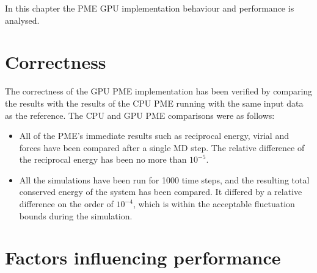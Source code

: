 \documentclass[12pt,a4paper]{report}
\newcommand{\draft}[1]{#1}
\begin{document}
In this chapter the PME GPU implementation behaviour and performance is analysed.

\section{Correctness}
The correctness of the GPU PME implementation has been verified by comparing the results with the results of the CPU PME running with the same input data as the reference.
The CPU and GPU PME comparisons were as follows:
\begin{itemize}
\item All of the PME's immediate results such as reciprocal energy, virial and forces have been compared after a single MD step. The relative difference of the reciprocal energy has been no more than $10^{-5}$. 


\item All the simulations have been run for 1000 time steps, and the resulting total conserved energy of the system has been compared. It differed by a relative difference on the order of $10^{-4}$, which is within the acceptable fluctuation bounds during the simulation.
\end{itemize} 

\section{Factors influencing performance}
\end{document}
